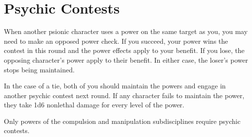 \section{Psychic Contests}
When another psionic character uses a power on the same target as you, you may need to make an opposed power check. If you succeed, your power wins the contest in this round and the power effects apply to your benefit. If you lose, the opposing character's power apply to their benefit. In either case, the loser's power stops being maintained.

In the case of a tie, both of you should maintain the powers and engage in another psychic contest next round. If any character fails to maintain the power, they take 1d6 nonlethal damage for every level of the power.

Only powers of the compulsion and manipulation subdisciplines require psychic contests.
